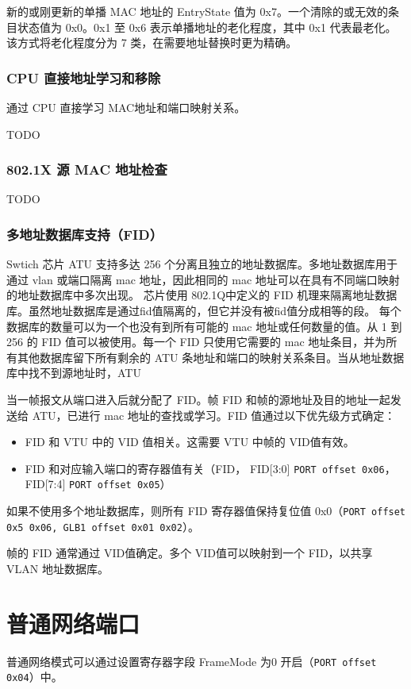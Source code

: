 新的或刚更新的单播 MAC 地址的 EntryState 值为 0x7。一个清除的或无效的条目状态值为 0x0。0x1 至 0x6 表示单播地址的老化程度，其中 0x1 代表最老化。
该方式将老化程度分为 7 类，在需要地址替换时更为精确。

\subsubsection{CPU 直接地址学习和移除}
通过 CPU 直接学习 MAC地址和端口映射关系。

TODO

\subsubsection{802.1X 源 MAC 地址检查}
TODO

\subsubsection{多地址数据库支持（FID）}
Swtich 芯片 ATU 支持多达 256 个分离且独立的地址数据库。多地址数据库用于通过 vlan 或端口隔离 mac 地址，因此相同的 mac 地址可以在具有不同端口映射的地址数据库中多次出现。
芯片使用 802.1Q中定义的 FID 机理来隔离地址数据库。虽然地址数据库是通过fid值隔离的，但它并没有被fid值分成相等的段。
每个数据库的数量可以为一个也没有到所有可能的 mac 地址或任何数量的值。从 1 到 256 的 FID 值可以被使用。每一个 FID 只使用它需要的 mac 地址条目，并为所有其他数据库留下所有剩余的 ATU 条地址和端口的映射关系条目。当从地址数据库中找不到源地址时，ATU 

当一帧报文从端口进入后就分配了 FID。帧 FID 和帧的源地址及目的地址一起发送给 ATU，已进行 mac 地址的查找或学习。FID 值通过以下优先级方式确定：
\begin{itemize}
    \item FID 和 VTU 中的 VID 值相关。这需要 VTU 中帧的 VID值有效。
    \item FID 和对应输入端口的寄存器值有关（FID， FID[3:0] \lstinline{PORT offset 0x06}，FID[7:4] \lstinline{PORT offset 0x05}）
\end{itemize}

如果不使用多个地址数据库，则所有 FID 寄存器值保持复位值 0x0（\lstinline{PORT offset 0x5 0x06, GLB1 offset 0x01 0x02}）。

帧的 FID 通常通过 VID值确定。多个 VID值可以映射到一个 FID，以共享 VLAN 地址数据库。

\section{普通网络端口}
普通网络模式可以通过设置寄存器字段 FrameMode 为0 开启（\lstinline{PORT offset 0x04}）中。

